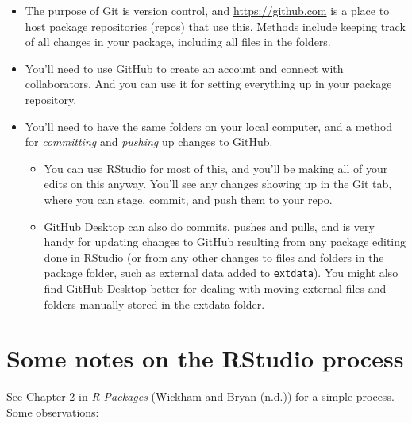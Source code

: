 \documentclass[
]{book}
\providecommand{\tightlist}{%
  \setlength{\itemsep}{0pt}\setlength{\parskip}{0pt}}
\begin{document}
\begin{itemize}
\item
  The purpose of Git is version control, and \url{https://github.com} is a place to host package repositories (repos) that use this. Methods include keeping track of all changes in your package, including all files in the folders.
\item
  You'll need to use GitHub to create an account and connect with collaborators. And you can use it for setting everything up in your package repository.
\item
  You'll need to have the same folders on your local computer, and a method for \emph{committing} and \emph{pushing} up changes to GitHub.

  \begin{itemize}
  \tightlist
  \item
    You can use RStudio for most of this, and you'll be making all of your edits on this anyway. You'll see any changes showing up in the Git tab, where you can stage, commit, and push them to your repo.\\
  \item
    GitHub Desktop can also do commits, pushes and pulls, and is very handy for updating changes to GitHub resulting from any package editing done in RStudio (or from any other changes to files and folders in the package folder, such as external data added to \texttt{extdata}). You might also find GitHub Desktop better for dealing with moving external files and folders manually stored in the extdata folder.
  \end{itemize}
\end{itemize}

\hypertarget{some-notes-on-the-rstudio-process}{%
\section{Some notes on the RStudio process}\label{some-notes-on-the-rstudio-process}}

See Chapter 2 in \emph{R Packages} (Wickham and Bryan (\protect\hyperlink{ref-r-pkgs}{n.d.})) for a simple process. Some observations:
\end{document}
